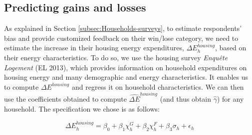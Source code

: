 \documentclass[12pt]{article} %
\begin{document}
\begin{appendices}
\subsection{Predicting gains and losses\label{appendix:estimation_feedback_regression}}



As explained in Section \ref{subsec:Households-surveys}, to estimate respondents' bias and provide customized feedback on their win/lose category, we need to estimate the increase in their housing energy expenditures, $\Delta E_h^{housing}$, based on their energy characteristics. To do so, we use the housing survey \emph{Enquête Logement} (EL 2013), which provides information on household expenditures on housing energy and many demographic and energy characteristics. It enables us to compute $\Delta E^{housing}$ and regress it on household characteristics. We can then use the coefficients obtained to compute $\widehat{\Delta E}^{housing}$ (and thus obtain $\widehat{\gamma}$) for any household. The specification we chose is as follows:

\begin{equation}
\label{formula_reg_net_gain}
    \Delta E^{housing}_h = \beta_0 + \beta_1 \chi^G_h + \beta_2 \chi^F_h + \beta_3 \sigma_h + \epsilon_h
\end{equation}



\end{appendices}
\end{document}
